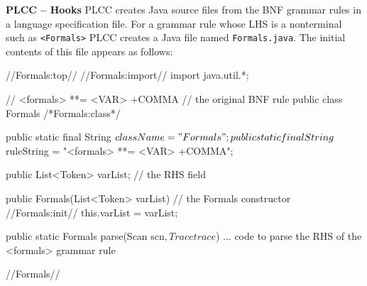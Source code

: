 \begin{minipage}[t]{\sw}
\slidenumber
\LARGE
{\bf PLCC -- Hooks}\exx
PLCC creates Java source files
from the BNF grammar rules in a language specification file.
For a grammar rule whose LHS is a nonterminal such as \verb'<Formals>'
PLCC creates a Java file named \verb'Formals.java'.
The initial contents of this file appears as follows:
{\large
\begin{qv}
//Formals:top//
//Formals:import//
import java.util.*;

// <formals> **= <VAR> +COMMA // the original BNF rule 
public class Formals /*Formals:class*/ {

    public static final String $className = "Formals";
    public static final String $ruleString = "<formals> **= <VAR> +COMMA";

    public List<Token> varList; // the RHS field

    public Formals(List<Token> varList) { // the Formals constructor
//Formals:init//
        this.varList = varList;
    }

    public static Formals parse(Scan scn$, Trace trace$) {
        ... code to parse the RHS of the <formals> grammar rule
    }

//Formals//
}
\end{qv}
}
\end{minipage}
\clearpage

